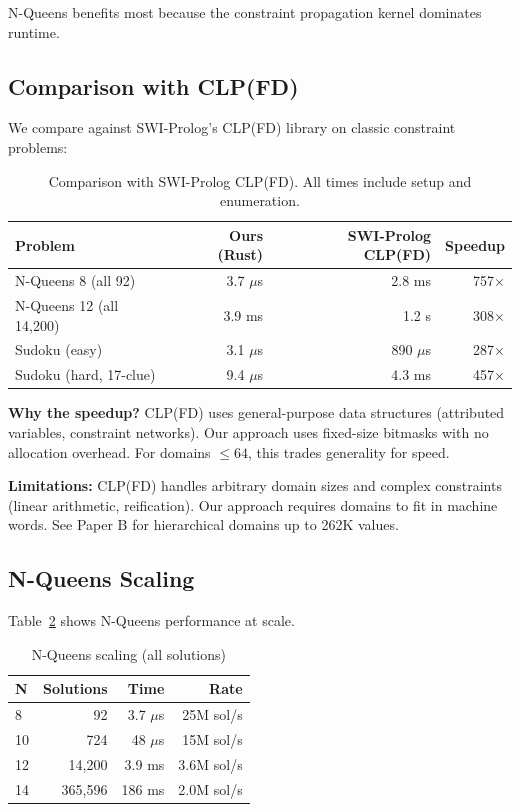 \documentclass[11pt,a4paper]{article}
\begin{document}
N-Queens benefits most because the constraint propagation kernel dominates runtime.

\subsection{Comparison with CLP(FD)}

We compare against SWI-Prolog's CLP(FD) library on classic constraint problems:

\begin{table}[ht]
\centering
\begin{tabular}{lrrr}
\toprule
\textbf{Problem} & \textbf{Ours (Rust)} & \textbf{SWI-Prolog CLP(FD)} & \textbf{Speedup} \\
\midrule
N-Queens 8 (all 92) & 3.7 $\mu$s & 2.8 ms & 757$\times$ \\
N-Queens 12 (all 14,200) & 3.9 ms & 1.2 s & 308$\times$ \\
Sudoku (easy) & 3.1 $\mu$s & 890 $\mu$s & 287$\times$ \\
Sudoku (hard, 17-clue) & 9.4 $\mu$s & 4.3 ms & 457$\times$ \\
\bottomrule
\end{tabular}
\caption{Comparison with SWI-Prolog CLP(FD). All times include setup and enumeration.}
\label{tab:clpfd}
\end{table}

\textbf{Why the speedup?}
CLP(FD) uses general-purpose data structures (attributed variables, constraint networks).
Our approach uses fixed-size bitmasks with no allocation overhead.
For domains $\leq 64$, this trades generality for speed.

\textbf{Limitations:}
CLP(FD) handles arbitrary domain sizes and complex constraints (linear arithmetic, reification).
Our approach requires domains to fit in machine words.
See Paper B for hierarchical domains up to 262K values.

\subsection{N-Queens Scaling}

Table~\ref{tab:nqueens} shows N-Queens performance at scale.

\begin{table}[ht]
\centering
\begin{tabular}{lrrr}
\toprule
\textbf{N} & \textbf{Solutions} & \textbf{Time} & \textbf{Rate} \\
\midrule
8 & 92 & 3.7 $\mu$s & 25M sol/s \\
10 & 724 & 48 $\mu$s & 15M sol/s \\
12 & 14,200 & 3.9 ms & 3.6M sol/s \\
14 & 365,596 & 186 ms & 2.0M sol/s \\
\bottomrule
\end{tabular}
\caption{N-Queens scaling (all solutions)}
\label{tab:nqueens}
\end{table}
\end{document}
